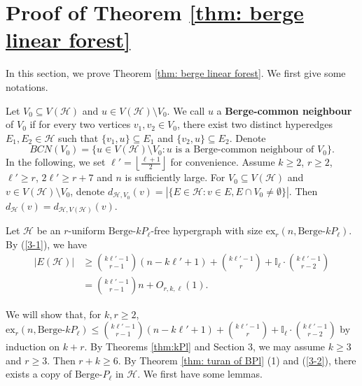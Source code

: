 \documentclass[12pt]{article}%
\newcommand{\ber}{\text{Berge-}}
\newcommand{\mh}{\mathcal{H}}
\newcommand{\lf}{\left\lfloor}
\newcommand{\rf}{\right\rfloor}
\newcommand{\lchuto}{\lf\frac{\ell+1}{2}\rf}
\begin{document}
\fi





\section{Proof of Theorem \ref{thm: berge linear forest}}
In this section, we prove  Theorem  \ref{thm: berge linear forest}.
We first give some notations.

Let  $V_0\subseteq V(\mh)$ and   $u\in V(\mh)\setminus V_0$.  We call %
$u$  a  {\bf Berge-common neighbour} of $V_0$ if  for every two vertices $v_1,v_2\in V_0$,  there exist two distinct hyperedges $E_1,E_2\in \mh$ such that $\{v_1,u\}\subseteq E_1$ and $\{v_2,u\}\subseteq E_2$. Denote $$BCN(V_0)=\{u\in V(\mh)\setminus V_0: u \mbox{~is a Berge-common neighbour of~} V_0\}.$$
In the following, we set $\ell'=\lchuto$ for convenience. Assume $k\geq 2$, $r\ge 2$, $\ell'\geq r$, $2\ell'\geq r+7$ and $n$ is sufficiently large. For  $V_0\subseteq V(\mh)$ and  $v\in V(\mh)\setminus V_0$, denote $d_{\mh,V_0}(v)=|\{E\in \mh:v\in E,E\cap V_0\not=\emptyset\}|$. Then $d_{\mh}(v)=d_{\mh,V(\mh)}(v)$.

Let $\mh$ be an $r$-uniform $\ber kP_{\ell}$-free hypergraph with size $\mathrm{ex}_r(n,\ber kP_{\ell})$. By (\ref{3-1}), we have
 \begin{align}\label{3-2}
|E(\mh)|&\ge {k\ell'-1\choose r-1}(n-k\ell'+1)+{k\ell'-1\choose r}+\mathbb{I}_\ell\cdot\binom{k\ell'-1}{r-2}\\
&= \binom{k\ell'-1}{r-1}n+O_{r,k,\ell}(1)\nonumber.
\end{align}

We will show that, for $k,r\ge 2$,  $\mathrm{ex}_r(n,\ber kP_{\ell})\le{k\ell'-1\choose r-1}(n-k\ell'+1)+{k\ell'-1\choose r}+\mathbb{I}_\ell\cdot\binom{k\ell'-1}{r-2}$ by induction on $k+r$.
By Theorems \ref{thm:kPl} and  Section 3,
 we may assume $k\geq 3$ and $r\geq 3$. Then $r+k\geq 6$. By Theorem \ref{thm: turan of BPl} (1) and (\ref{3-2}), there exists a copy of $\ber P_{\ell}$ in $\mh$. We first have some lemmas.
\end{document}
